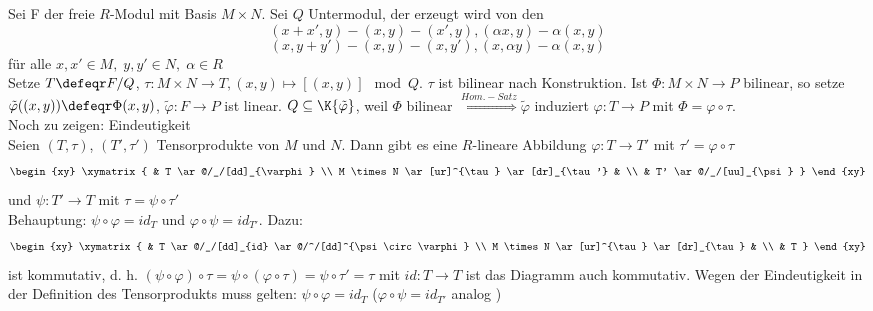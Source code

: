 \begin{anBew}
  Sei F der freie $R$-Modul mit Basis $M \times N$.
  Sei $Q$ Untermodul, der erzeugt wird von den \[(x + x',y) - (x,y) - (x',y),
  (\alpha x,y) - \alpha (x,y)\] \[(x,y + y') - (x,y) - (x,y'),
  (x,\alpha y) - \alpha (x,y)\] für alle $x,x' \in M,\; y,y' \in N,\;\alpha \in
  R$\\
  Setze $T \defeqr F/Q$, $\tau: M \times N \to T, (x,y) \mapsto [(x,y)]
  \mod Q$. $\tau$ ist bilinear nach Konstruktion.
  Ist $\Phi: M \times N \to P$ bilinear, so setze $\tilde{\varphi}((x,y))
  \defeqr \Phi(x,y)$, $\tilde{\varphi}: F \to P$ ist linear. $Q \subseteq
  \K{\tilde{\varphi}}$, weil $\Phi$ bilinear $\overset{Hom.-Satz}{\Rightarrow}
  \tilde{\varphi}$ induziert $\varphi: T \to P$ mit $\Phi = \varphi \circ \tau$.\\
  Noch zu zeigen: Eindeutigkeit\\
  Seien $(T, \tau)$, $(T', \tau')$ Tensorprodukte von $M$ und $N$. Dann gibt es eine $R$-lineare 
  Abbildung $\varphi: T \rightarrow T'$ mit $\tau'= \varphi \circ \tau$
  \[\begin{xy}
      \xymatrix{
                                                  & T \ar@/_/[dd]_{\varphi} \\
        M \times N \ar[ur]^{\tau} \ar[dr]_{\tau'} &                     \\
                                                  & T' \ar@/_/[uu]_{\psi}
      }
    \end{xy}\]
  und $\psi: T' \rightarrow T$ mit $\tau = \psi \circ\tau'$\\
  Behauptung: $\psi \circ \varphi = id_T$ und $\varphi \circ \psi = id_{T'}$. Dazu:
  \[\begin{xy}
      \xymatrix{
                                                 & T \ar@/_/[dd]_{id}
                                                 \ar@/^/[dd]^{\psi \circ \varphi} \\
        M \times N \ar[ur]^{\tau} \ar[dr]_{\tau} &                     \\
                                                 & T
      }
    \end{xy}\]
  ist kommutativ, d. h. 
  $(\psi \circ \varphi ) \circ \tau = \psi \circ ( \varphi \circ \tau) = \psi \circ \tau' = \tau$
  mit $id: T \rightarrow T$ ist das Diagramm auch kommutativ. Wegen der Eindeutigkeit in der 
  Definition des Tensorprodukts muss gelten: $\psi \circ \varphi = id_T$
  ($\varphi \circ \psi = id_{T'}$ analog )
\end{anBew}

